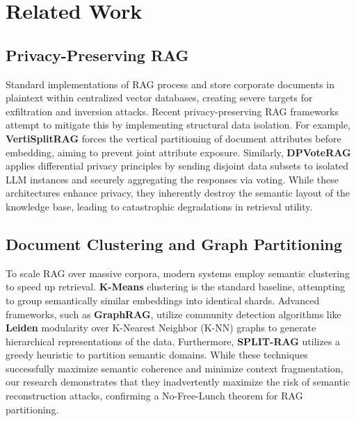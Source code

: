 \section{Related Work}

\subsection{Privacy-Preserving RAG}
Standard implementations of RAG process and store corporate documents in plaintext within centralized vector databases, creating severe targets for exfiltration and inversion attacks. Recent privacy-preserving RAG frameworks attempt to mitigate this by implementing structural data isolation. For example, \textbf{VertiSplitRAG} forces the vertical partitioning of document attributes before embedding, aiming to prevent joint attribute exposure. Similarly, \textbf{DPVoteRAG} applies differential privacy principles by sending disjoint data subsets to isolated LLM instances and securely aggregating the responses via voting. While these architectures enhance privacy, they inherently destroy the semantic layout of the knowledge base, leading to catastrophic degradations in retrieval utility.

\subsection{Document Clustering and Graph Partitioning}
To scale RAG over massive corpora, modern systems employ semantic clustering to speed up retrieval. \textbf{K-Means} clustering is the standard baseline, attempting to group semantically similar embeddings into identical shards. Advanced frameworks, such as \textbf{GraphRAG}, utilize community detection algorithms like \textbf{Leiden} modularity over K-Nearest Neighbor (K-NN) graphs to generate hierarchical representations of the data. Furthermore, \textbf{SPLIT-RAG} utilizes a greedy heuristic to partition semantic domains. While these techniques successfully maximize semantic coherence and minimize context fragmentation, our research demonstrates that they inadvertently maximize the risk of semantic reconstruction attacks, confirming a No-Free-Lunch theorem for RAG partitioning.
